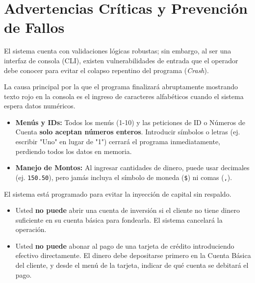 \documentclass[12pt, letterpaper]{article}
\begin{document}
	\section{Advertencias Críticas y Prevención de Fallos}
	El sistema cuenta con validaciones lógicas robustas; sin embargo, al ser una interfaz de consola (CLI), existen vulnerabilidades de entrada que el operador debe conocer para evitar el colapso repentino del programa (\textit{Crash}).
	
	\begin{tcolorbox}[colback=lightgray, colframe=warningred, title=\textbf{1. ERROR FATAL: Ingreso de Letras por Números (\texttt{InputMismatchException})}]
		La causa principal por la que el programa finalizará abruptamente mostrando texto rojo en la consola es el ingreso de caracteres alfabéticos cuando el sistema espera datos numéricos. 
		\begin{itemize}
			\item \textbf{Menús y IDs:} Todos los menús (1-10) y las peticiones de ID o Números de Cuenta \textbf{solo aceptan números enteros}. Introducir símbolos o letras (ej. escribir "Uno" en lugar de "1") cerrará el programa inmediatamente, perdiendo todos los datos en memoria.
			\item \textbf{Manejo de Montos:} Al ingresar cantidades de dinero, puede usar decimales (ej. \texttt{150.50}), pero jamás incluya el símbolo de moneda (\texttt{\$}) ni comas (\texttt{,}).
		\end{itemize}
	\end{tcolorbox}
	
	\begin{tcolorbox}[colback=lightgray, colframe=primary, title=\textbf{2. ADVERTENCIA LÓGICA: Política de ''Cero Dinero Fantasma''}]
		El sistema está programado para evitar la inyección de capital sin respaldo. 
		\begin{itemize}
			\item Usted \textbf{no puede} abrir una cuenta de inversión si el cliente no tiene dinero suficiente en su cuenta básica para fondearla. El sistema cancelará la operación.
			\item Usted \textbf{no puede} abonar al pago de una tarjeta de crédito introduciendo efectivo directamente. El dinero debe depositarse primero en la Cuenta Básica del cliente, y desde el menú de la tarjeta, indicar de qué cuenta se debitará el pago.
		\end{itemize}
	\end{tcolorbox}
	
\end{document}

